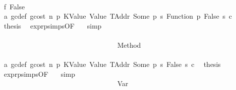 \begin{isabellebody}
\ \ \ \ \ \ \ \ \ \ \ \ \ \ \ \ \ \ \ \ \ \ \ \ \ \ \ \ \ \ \ \ \ \ \isamarkupfalse%
\isanewline
\ \ \ \ \ \ \ \ \ \ \ \ \ \ \ \ \ \ \ \ \ \ \ \ \ \ \ \ \ \ \ \ \ \ \ \ \isamarkupfalse%
\ f{\isacharcolon}{\kern0pt}\ False\isanewline
\ \ \ \ \ \ \ \ \ \ \ \ \ \ \ \ \ \ \ \ \ \ \ \ \ \ \ \ \ \ \ \ \ \ \ \ \isamarkupfalse%
\ a{}\ gc{\isacharunderscore}{\kern0pt}def\ gcost\ n\ p{}\ KValue\ Value\ TAddr\ Some\ p{}\ s{}\ Function\ p{}\ False\ s{}\ c\ \isamarkupfalse%
\ {\isacharquery}{\kern0pt}thesis\ \isamarkupfalse%
\ expr{\isachardot}{\kern0pt}psimps{\isacharparenleft}{\kern0pt}{}{}{\isacharparenright}{\kern0pt}{\isacharbrackleft}{\kern0pt}OF\ {}{}{\isacharparenleft}{\kern0pt}{}{\isacharparenright}{\kern0pt}{\isacharbrackright}{\kern0pt}\ \isamarkupfalse%
\ simp\isanewline
\ \ \ \ \ \ \ \ \ \ \ \ \ \ \ \ \ \ \ \ \ \ \ \ \ \ \ \ \ \ \ \ \ \ \isamarkupfalse%
\isanewline
\ \ \ \ \ \ \ \ \ \ \ \ \ \ \ \ \ \ \ \ \ \ \ \ \ \ \ \ \ \ \ \ \isamarkupfalse%
\isanewline
\ \ \ \ \ \ \ \ \ \ \ \ \ \ \ \ \ \ \ \ \ \ \ \ \ \ \ \ \ \ \isamarkupfalse%
\isanewline
\ \ \ \ \ \ \ \ \ \ \ \ \ \ \ \ \ \ \ \ \ \ \ \ \ \ \ \ \ \ \ \ \isamarkupfalse%
\ {\isacharparenleft}{\kern0pt}Method\ {\isacharunderscore}{\kern0pt}{\isacharparenright}{\kern0pt}\isanewline
\ \ \ \ \ \ \ \ \ \ \ \ \ \ \ \ \ \ \ \ \ \ \ \ \ \ \ \ \ \ \ \ \isamarkupfalse%
\ a{}\ gc{\isacharunderscore}{\kern0pt}def\ gcost\ n\ p{}\ KValue\ Value\ TAddr\ Some\ p{}\ s{}\ False\ s{}\ c\ \isamarkupfalse%
\ {\isacharquery}{\kern0pt}thesis\ \isamarkupfalse%
\ expr{\isachardot}{\kern0pt}psimps{\isacharparenleft}{\kern0pt}{}{}{\isacharparenright}{\kern0pt}{\isacharbrackleft}{\kern0pt}OF\ {}{}{\isacharparenleft}{\kern0pt}{}{\isacharparenright}{\kern0pt}{\isacharbrackright}{\kern0pt}\ \isamarkupfalse%
\ simp\isanewline
\ \ \ \ \ \ \ \ \ \ \ \ \ \ \ \ \ \ \ \ \ \ \ \ \ \ \ \ \ \ \isamarkupfalse%
\isanewline
\ \ \ \ \ \ \ \ \ \ \ \ \ \ \ \ \ \ \ \ \ \ \ \ \ \ \ \ \ \ \ \ \isamarkupfalse%
\ {\isacharparenleft}{\kern0pt}Var\ {\isacharunderscore}{\kern0pt}{\isacharparenright}{\kern0pt}\isanewline
\ \ \ \ \ \ \ \ \ \ \ \ \ \ \ \ \ \ \ \ \ \ \ \ \ \ \ \ \ \ \ \ \isamarkupfalse%

\end{isabellebody}
